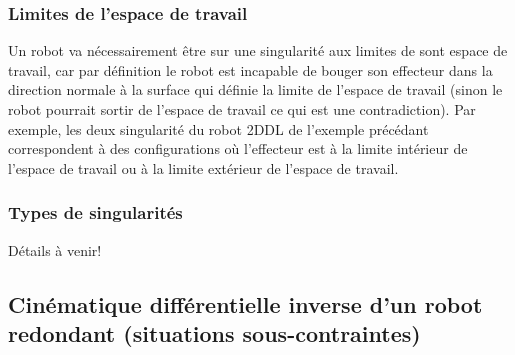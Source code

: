\subsubsection{Limites de l'espace de travail}

Un robot va nécessairement être sur une singularité aux limites de sont espace de travail, car par définition le robot est incapable de bouger son effecteur dans la direction normale à la surface qui définie la limite de l'espace de travail (sinon le robot pourrait sortir de l'espace de travail ce qui est une contradiction). Par exemple, les deux singularité du robot 2DDL de l'exemple précédant correspondent à des configurations où l'effecteur est à la limite intérieur de l'espace de travail ou à la limite extérieur de l'espace de travail. 


\subsubsection{Types de singularités}

Détails à venir!


\subsection{Cinématique différentielle inverse d'un robot redondant (situations sous-contraintes)}
\label{sec:invdiffkinredondant}

